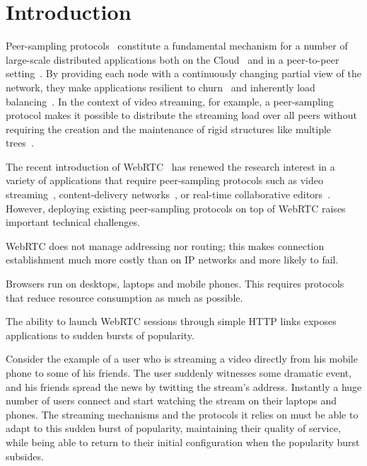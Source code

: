 \newcommand\SCALE{0.47}

\section{Introduction}

Peer-sampling
protocols~\cite{jelasity2007gossip,tolgyeski2009adaptive,voulgaris2005cyclon}
constitute a fundamental mechanism for a number of large-scale distributed
applications both on the Cloud~\cite{decandia2007dynamo} and in a peer-to-peer
setting~\cite{Frey09Middleware,voulgaris2005sub,wuhib2009robust}. By providing
each node with a continuously changing partial view of the network, they make
applications resilient to churn~\cite{bertier-d2ht} and inherently load
balancing~\cite{Frey09DSN}. In the context of video streaming, for example, a
peer-sampling protocol makes it possible to distribute the streaming load over
all peers without requiring the creation and the maintenance of rigid structures
like multiple trees~\cite{Frey09DSN,monod:THESIS}.

The recent introduction of WebRTC~\cite{webrtc} has renewed the
research interest in a variety of applications that require
peer-sampling protocols such as video streaming~\cite{hivejs,smoothcache2},
content-delivery networks~\cite{Zhang:2013:MBC:2465351.2465379}, or
real-time collaborative editors~\cite{nedelec2016crate}. However,
deploying existing peer-sampling protocols on top of WebRTC raises
important technical challenges.
\begin{inparaenum}[(1)]
\item WebRTC does not manage addressing nor routing; this makes
  connection establishment much more costly than on IP networks and
  more likely to fail. 
\item Browsers run on desktops, laptops and mobile phones. This
  requires protocols that reduce resource consumption as much as
  possible.
\item The ability to launch WebRTC sessions through simple HTTP links
  exposes applications to sudden bursts of popularity.
\end{inparaenum}
Consider the example of a user who is streaming a video directly from
his mobile phone to some of his friends. The user suddenly witnesses
some dramatic event, and his friends spread the news by twitting the
stream's address. Instantly a huge number of users connect and start
watching the stream on their laptops and phones. The streaming
mechanisms and the protocols it relies on must be able to adapt to
this sudden burst of popularity, maintaining their quality of service,
while being able to return to their initial configuration when the
popularity burst subsides. 

